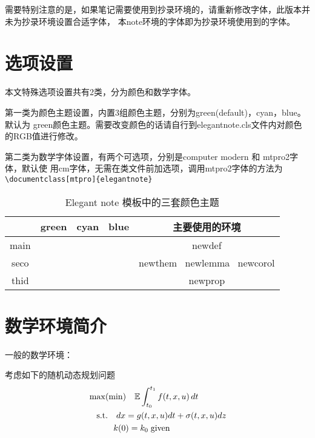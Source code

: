 \documentclass[cyan]{elegantnote}
\begin{document}
\begin{note}
需要特别注意的是，如果笔记需要使用到抄录环境的，请重新修改字体，此版本并未为抄录环境设置合适字体，
本note环境的字体即为抄录环境使用到的字体。
\end{note}

\section{选项设置}
本文特殊选项设置共有2类，分为{\color{main}颜色}和{\color{main}数学字体}。

第一类为{\color{main}颜色}主题设置，内置3组颜色主题，分别为green(default)，cyan，blue。默认为
green颜色主题。需要改变颜色的话请自行到elegantnote.cls文件内对颜色的RGB值进行修改。

第二类为{\color{main}数学字体}设置，有两个可选项，分别是computer modern 和 mtpro2字体，默认使
用cm字体，无需在类文件前加选项，调用mtpro2字体的方法为\verb|\documentclass[mtpro]{elegantnote}|

\begin{table}[H]
\centering
\begin{tabular}{ccccc}
\toprule	
	   & green & cyan & blue & 主要使用的环境\\ 
\midrule
main & \makecell{{\color{main1}\rule{1cm}{1cm}}}& \makecell{{\color{main2}\rule{1cm}{1cm}}}
&\makecell{ {\color{main3}\rule{1cm}{1cm}}}& newdef\\

seco &\makecell{ {\color{seco1}\rule{1cm}{1cm}}}& \makecell{{\color{seco2}\rule{1cm}{1cm}}}
&\makecell{ {\color{seco3}\rule{1cm}{1cm}}}&newthem \ newlemma \ newcorol\\

thid &\makecell{ {\color{thid1}\rule{1cm}{1cm}}}& \makecell{{\color{thid2}\rule{1cm}{1cm}}}
&\makecell{ {\color{thid3}\rule{1cm}{1cm}}}&newprop\\
\bottomrule
\end{tabular}
\caption{Elegant note 模板中的三套颜色主题\label{tab:color thm}}
\end{table}

\section{数学环境简介}
一般的数学环境：

考虑如下的随机动态规划问题
\begin{align*}
&\max(\min)\quad \mathbb{E}\int_{t_0}^{t_1}f(t,x,u)\,dt\\
&\quad\mbox{s.t.} \quad dx=g(t,x,u)dt+\sigma(t,x,u)dz\\
&\quad \hspace{2.em} k(0)=k_0\;\text{given}
\end{align*}
\end{document}
